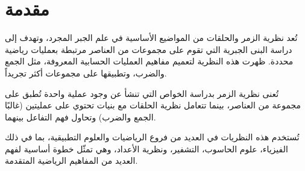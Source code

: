 \chapter*{مقدمة}
تُعد نظرية الزمر والحلقات من المواضيع الأساسية في علم الجبر المجرد، وتهدف إلى دراسة البنى الجبرية التي تقوم على مجموعات من العناصر مرتبطة بعمليات رياضية محددة. ظهرت هذه النظرية لتعميم مفاهيم العمليات الحسابية المعروفة، مثل الجمع والضرب، وتطبيقها على مجموعات أكثر تجريداً.

\noindent
تُعنى نظرية الزمر بدراسة الخواص التي تنشأ عن وجود عملية واحدة تُطبق على مجموعة من العناصر، بينما تتعامل نظرية الحلقات مع بنيات تحتوي على عمليتين (غالبًا الجمع والضرب) وتحاول فهم التفاعل بينهما.

\noindent
تُستخدم هذه النظريات في العديد من فروع الرياضيات والعلوم التطبيقية، بما في ذلك الفيزياء، علوم الحاسوب، التشفير، ونظرية الأعداد، وهي تمثّل خطوة أساسية لفهم العديد من المفاهيم الرياضية المتقدمة.